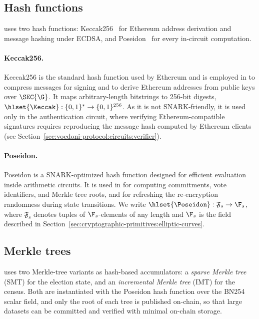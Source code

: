 \subsection{Hash functions}
\label{sec:cryptographic-primitives:hash}

\Davinci uses two hash functions: Keccak256~\cite{bertoni2011keccak} for Ethereum address derivation and message hashing under ECDSA, and Poseidon~\cite{grassi2021poseidon} for every in-circuit computation.

\paragraph{Keccak256.} Keccak256 is the standard hash function used by Ethereum and is employed in \davinci to compress messages for signing and to derive Ethereum addresses from public keys over $\SEC{\G}$. It maps arbitrary-length bitstrings to 256-bit digests, $\hlset{\Keccak} : \{0,1\}^* \rightarrow \{0,1\}^{256}$. As it is not SNARK-friendly, it is used only in the authentication circuit, where verifying Ethereum-compatible signatures requires reproducing the message hash computed by Ethereum clients (see Section~\ref{sec:vocdoni-protocol:circuits:verifier}).

\paragraph{Poseidon.} Poseidon is a SNARK-optimized hash function designed for efficient evaluation inside arithmetic circuits. It is used in \davinci for computing commitments, vote identifiers, and Merkle tree roots, and for refreshing the re-encryption randomness during state transitions. We write $\hlset{\Poseidon} : \mathfrak{F}_s \rightarrow \F_s$, where $\mathfrak{F}_s$ denotes tuples of $\F_s$-elements of any length and $\F_s$ is the field described in Section~\ref{sec:cryptographic-primitives:elliptic-curves}.

\subsection{Merkle trees}
\label{sec:cryptographic-primitives:merkle-trees}

\davinci uses two Merkle-tree variants as hash-based accumulators: a \emph{sparse Merkle tree} (SMT) for the election state, and an \emph{incremental Merkle tree} (IMT) for the census. Both are instantiated with the Poseidon hash function over the BN254 scalar field, and only the root of each tree is published on-chain, so that large datasets can be committed and verified with minimal on-chain storage.

